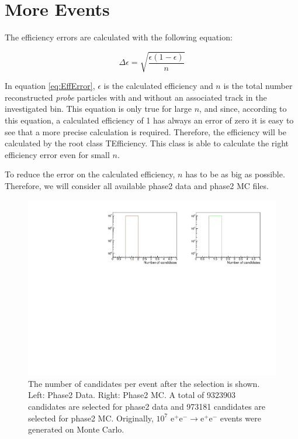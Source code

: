 \documentclass[a4paper,11pt,twosided,final,german,openbib,pdftex,listof=totoc,bibliography=totoc]{scrbook}
\begin{document}
\section{More Events}
\label{sec:Phase2MoreEvents}


The efficiency errors are calculated with the following equation:

\begin{equation}
\Delta \epsilon = \sqrt{\frac{\epsilon(1-\epsilon)}{n}}
\label{eq:EffError}
\end{equation}

In equation \ref{eq:EffError}, $\epsilon$ is the calculated efficiency and $n$ is the total number reconstructed \textit{probe} particles with and without an associated track in the investigated bin. This equation is only true for large $n$, and since, according to this equation, a calculated efficiency of 1 has always an error of zero it is easy to see that a more precise calculation is required. Therefore, the efficiency will be calculated by the root class TEfficiency. This class is able to calculate the right efficiency error even for small $n$. \cite{TEfficiency}



To reduce the error on the calculated efficiency, $n$ has to be as big as possible. Therefore, we will consider all available  phase2 data and phase2 MC files. 


\begin{figure}[h!]
	\includegraphics[width=\textwidth]{Plots/master/CCand.pdf}
	\caption[Total Number Of Events After The Selection]{The number of candidates per event after the selection is shown. Left: Phase2 Data. Right: Phase2 MC. A total of 9323903 candidates are selected for phase2 data and 973181 candidates are selected for phase2 MC. Originally, $10^7$ $ \textrm{e}^+\textrm{e}^- \rightarrow  \textrm{e}^+\textrm{e}^-$ events were generated on Monte Carlo.}
	\label{fig:nCandAS}
\end{figure}
\end{document}
